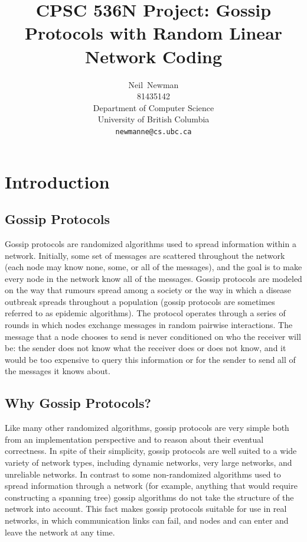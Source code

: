 \documentclass{article} %
\title{CPSC 536N Project: Gossip Protocols with Random Linear Network Coding}
\author{
Neil~Newman\\
81435142\\
Department of Computer Science\\
University of British Columbia\\
\texttt{newmanne@cs.ubc.ca}
}
\begin{document}
\maketitle

\section{Introduction}
\subsection{Gossip Protocols}
Gossip protocols are randomized algorithms used to spread information within a network. Initially, some set of messages are scattered throughout the network (each node may know none, some, or all of the messages), and the goal is to make every node in the network know all of the messages. Gossip protocols are modeled on the way that rumours spread among a society or the way in which a disease outbreak spreads throughout a population (gossip protocols are sometimes referred to as epidemic algorithms). The protocol operates through a series of rounds in which nodes exchange messages in random pairwise interactions. The message that a node chooses to send is never conditioned on who the receiver will be: the sender does not know what the receiver does or does not know, and it would be too expensive to query this information or for the sender to send all of the messages it knows about.

\subsection{Why Gossip Protocols?}
Like many other randomized algorithms, gossip protocols are very simple both from an implementation perspective and to reason about their eventual correctness. In spite of their simplicity, gossip protocols are well suited to a wide variety of network types, including dynamic networks, very large networks, and unreliable networks. In contrast to some non-randomized algorithms used to spread information through a network (for example, anything that would require constructing a spanning tree) gossip algorithms do not take the structure of the network into account. This fact makes gossip protocols suitable for use in real networks, in which communication links can fail, and nodes and can enter and leave the network at any time. 
\end{document}
